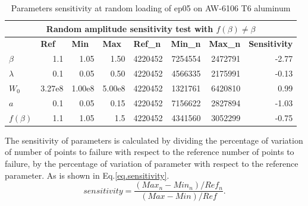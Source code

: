 \begin{table}[!h]
\centering
\begin{tabular}{lrrrrrrr}
\hline
\multicolumn{8}{c}{\textbf{Random amplitude sensitivity test with $f(\beta)\neq\beta$}}                                                                                                                                                                                                   \\ \hline
\textbf{}           & \multicolumn{1}{l}{\textbf{Ref}} & \multicolumn{1}{l}{\textbf{Min}} & \multicolumn{1}{l}{\textbf{Max}} & \multicolumn{1}{l}{\textbf{Ref\_n}} & \multicolumn{1}{l}{\textbf{Min\_n}} & \multicolumn{1}{l}{\textbf{Max\_n}} & \multicolumn{1}{l}{\textbf{Sensitivity}} \\ \hline
\textbf{$\beta$}    & 1.1                              & 1.05                             & 1.50                             & 4220452                             & 7254554                             & 2472791                             & -2.77                                    \\
\textbf{$\lambda$}  & 0.1                              & 0.05                             & 0.50                             & 4220452                             & 4566335                             & 2175991                             & -0.13                                    \\
\textbf{$W_0$}      & 3.27e8                         & 1.00e8                         & 5.00e8                         & 4220452                             & 1321761                             & 6420810                             & 0.99                                     \\
\textbf{$a$}        & 0.1                              & 0.05                             & 0.15                             & 4220452                             & 7156622                             & 2827894                             & -1.03                                    \\
\textbf{$f(\beta)$} & 1.1                              & 1.05                             & 1.5                              & 4220452                             & 4341560                             & 3052299                             & -0.75                                    \\ \hline
\end{tabular}
\caption{Parameters sensitivity at random loading of ep05 on AW-6106 T6 aluminum}
\label{tab.sensitivity_random2}
\end{table}
The sensitivity of parameters is calculated by dividing the percentage of variation of  number of points to failure with respect to the reference number of points to failure, by the percentage of variation of parameter with respect to the reference parameter. As is shown in Eq.\eqref{eq.sensitivity}.
\begin{equation}
sensitivity = \dfrac{\left( Max_n-Min_n\right)/Ref_n}{\left( Max-Min\right)/Ref}.
\label{eq.sensitivity}
\end{equation}



